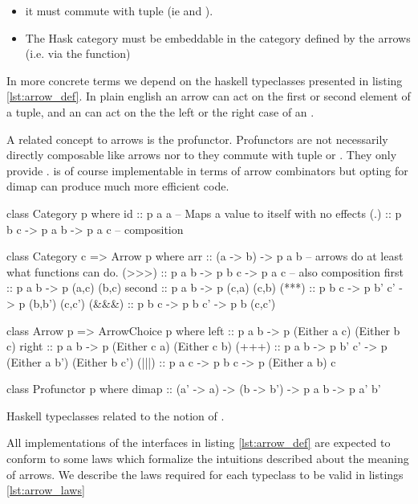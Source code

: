 \begin{itemize}
\item it must commute with tuple (ie  and ).
\item The Hask category must be embeddable in the category defined by the
arrows (i.e. via the  function)
\end{itemize}

In more concrete terms we depend on the haskell typeclasses presented
in listing \ref{lst:arrow_def}. In plain english an arrow can act on
the first or second element of a tuple, and an  can
act on the the left or the right case of an .

A related concept to arrows is the profunctor. Profunctors are not
necessarily directly composable like arrows nor to they commute with
tuple or . They only provide . 
is of course implementable in terms of arrow combinators but opting
for dimap can produce much more efficient code.


\begin{code}
\begin{haskellcode}
class Category p where
  id :: p a a -- Maps a value to itself with no effects
  (.) :: p b c -> p a b -> p a c -- composition

class Category c => Arrow p where
  arr :: (a -> b) -> p a b -- arrows do at least what functions can do.
  (>>>) :: p a b -> p b c -> p a c -- also composition
  first :: p a b -> p (a,c) (b,c)
  second :: p a b -> p (c,a) (c,b)
  (***) :: p b c -> p b' c' -> p (b,b') (c,c')
  (&&&) :: p b c -> p b c' -> p b (c,c')

class Arrow p => ArrowChoice p where
  left :: p a b -> p (Either a c) (Either b c)
  right :: p a b -> p (Either c a) (Either c b)
  (+++) :: p a b -> p b' c' -> p (Either a b') (Either b c')
  (|||) :: p a c -> p b c -> p (Either a b) c

class Profunctor p where
  dimap :: (a' -> a) -> (b -> b') -> p a b -> p a' b'
\end{haskellcode}
\label{lst:arrow_def}
\caption{Haskell typeclasses related to the notion of .}
\end{code}


All implementations of the interfaces in listing \ref{lst:arrow_def}
are expected to conform to some laws which formalize the intuitions
described about the meaning of arrows. We describe the laws required
for each typeclass to be valid in listings \ref{lst:arrow_laws}

